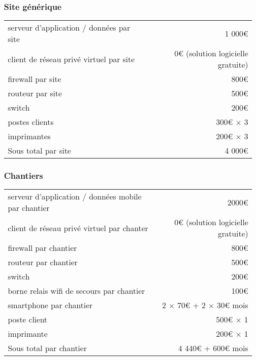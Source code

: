         \subsubsection{Site générique}
            \begin{tabular*}{\textwidth}{ l @{\extracolsep{\fill}} r }
	            serveur d'application / données par site  & 1 000€ \\ 
	            client de réseau privé virtuel par site   & 0€ (solution logicielle gratuite)\\ 
                firewall par site                         & 800€ \\ 
	            routeur par site                          & 500€ \\ 
	            switch                                    & 200€ \\ 
	            postes clients                            & 300€ $\times$ 3 \\
	            imprimantes                               & 200€ $\times$ 3 \\ \hline
	            Sous total par site                       & 4 000€
            \end{tabular*}

        \subsubsection{Chantiers}
            \begin{tabular*}{\textwidth}{ l @{\extracolsep{\fill}} r }
	            serveur d'application / données mobile par chantier     & 2000€ \\ 
	            client de réseau privé virtuel par chanter              & 0€ (solution logicielle gratuite)\\ 
	            firewall par chantier                                   & 800€ \\ 
	            routeur par chantier                                    & 500€ \\ 
	            switch                                                  & 200€ \\ 
	            borne relais wifi de secours par chantier               & 100€ \\ 
	            smartphone par chantier                                 & 2 $\times$ 70€ + 2 $\times$ 30€ \/ mois\\ 
	            poste client                                            & 500€ $\times$ 1 \\
	            imprimante                                              & 200€ $\times$ 1 \\ \hline
	            Sous total par chantier                                 & 4 440€ + 600€ \/mois
            \end{tabular*}


